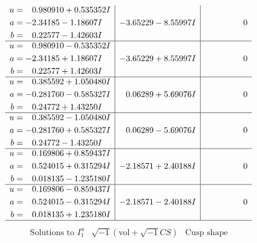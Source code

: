 \documentclass[1p]{elsarticle_modified}
\theoremstyle{definition}
\newcommand{\I}{\sqrt{-1}}
\begin{document}
$$\begin{array}{c|c|c}
\begin{aligned}
u &= \phantom{-}0.980910 + 0.535352 I \\
a &= -2.34185 - 1.18607 I \\
b &= \phantom{-}0.22577 - 1.42603 I\end{aligned}
 & -3.65229 - 8.55997 I & \phantom{-0.000000 } 0 \\ \hline\begin{aligned}
u &= \phantom{-}0.980910 - 0.535352 I \\
a &= -2.34185 + 1.18607 I \\
b &= \phantom{-}0.22577 + 1.42603 I\end{aligned}
 & -3.65229 + 8.55997 I & \phantom{-0.000000 } 0 \\ \hline\begin{aligned}
u &= \phantom{-}0.385592 + 1.050480 I \\
a &= -0.281760 - 0.585327 I \\
b &= \phantom{-}0.24772 + 1.43250 I\end{aligned}
 & \phantom{-}0.06289 + 5.69076 I & \phantom{-0.000000 } 0 \\ \hline\begin{aligned}
u &= \phantom{-}0.385592 - 1.050480 I \\
a &= -0.281760 + 0.585327 I \\
b &= \phantom{-}0.24772 - 1.43250 I\end{aligned}
 & \phantom{-}0.06289 - 5.69076 I & \phantom{-0.000000 } 0 \\ \hline\begin{aligned}
u &= \phantom{-}0.169806 + 0.859437 I \\
a &= \phantom{-}0.524015 + 0.315294 I \\
b &= \phantom{-}0.018135 - 1.235180 I\end{aligned}
 & -2.18571 + 2.40188 I & \phantom{-0.000000 } 0 \\ \hline\begin{aligned}
u &= \phantom{-}0.169806 - 0.859437 I \\
a &= \phantom{-}0.524015 - 0.315294 I \\
b &= \phantom{-}0.018135 + 1.235180 I\end{aligned}
 & -2.18571 - 2.40188 I & \phantom{-0.000000 } 0\\
 \hline 
 \end{array}$$\newpage$$\begin{array}{c|c|c}  
\text{Solutions to }I^u_{1}& \I (\text{vol} + \sqrt{-1}CS) & \text{Cusp shape}\\

\end{array}$$
\end{document}
